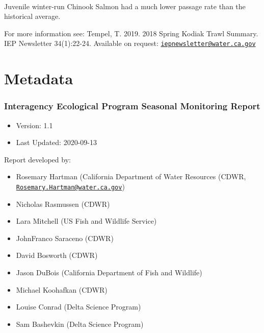 \documentclass[
]{book}
\providecommand{\tightlist}{%
  \setlength{\itemsep}{0pt}\setlength{\parskip}{0pt}}
\begin{document}
\begin{panel-grid}
\begin{columns-nocenter}
\begin{column40}

~

\end{column40}

\begin{column800}

Juvenile winter-run Chinook Salmon had a much lower passage rate than the historical average.

\end{column800}

\end{columns-nocenter}

\end{panel-grid}

\begin{disclaimer}
For more information see: Tempel, T. 2019. 2018 Spring Kodiak Trawl
Summary. IEP Newsletter 34(1):22-24. Available on request:
\href{mailto:iepnewsletter@water.ca.gov}{\nolinkurl{iepnewsletter@water.ca.gov}}
\end{disclaimer}

\hypertarget{metadata}{%
\chapter{Metadata}\label{metadata}}

\hypertarget{interagency-ecological-program-seasonal-monitoring-report}{%
\subsection{Interagency Ecological Program Seasonal Monitoring Report}\label{interagency-ecological-program-seasonal-monitoring-report}}

\begin{itemize}
\tightlist
\item
  Version: 1.1
\item
  Last Updated: 2020-09-13
\end{itemize}

Report developed by:

\begin{itemize}
\tightlist
\item
  Rosemary Hartman (California Department of Water Resources (CDWR, \href{mailto:Rosemary.Hartman@water.ca.gov}{\nolinkurl{Rosemary.Hartman@water.ca.gov}})
\item
  Nicholas Rasmussen (CDWR)
\item
  Lara Mitchell (US Fish and Wildlife Service)
\item
  JohnFranco Saraceno (CDWR)
\item
  David Bosworth (CDWR)
\item
  Jason DuBois (California Department of Fish and Wildlife)
\item
  Michael Koohafkan (CDWR)
\item
  Louise Conrad (Delta Science Program)
\item
  Sam Bashevkin (Delta Science Program)
\end{itemize}
\end{document}
